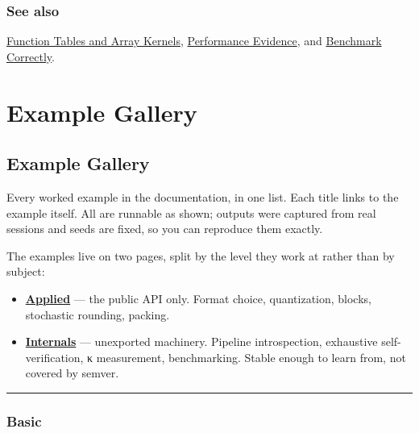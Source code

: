 \subsection{See also}



\label{292862844209942199-dup9}{}


\href{internals\_\allowbreak{}tables.md}{Function Tables and Array Kernels}, \href{examples\_\allowbreak{}performance.md}{Performance Evidence}, and \href{internals\_\allowbreak{}benchmark.md}{Benchmark Correctly}.



\chapter{Example Gallery}


\section{Example Gallery}



\label{8031767541052014994}{}


Every worked example in the documentation, in one list. Each title links to the example itself. All are runnable as shown; outputs were captured from real sessions and seeds are fixed, so you can reproduce them exactly.



The examples live on two pages, split by the level they work at rather than by subject:



\begin{itemize}
\item \textbf{\href{examples\_\allowbreak{}applied.md}{Applied}} — the public API only. Format choice, quantization, blocks, stochastic rounding, packing.


\item \textbf{\href{examples\_\allowbreak{}verification.md}{Internals}} — unexported machinery. Pipeline introspection, exhaustive self-verification, κ measurement, benchmarking. Stable enough to learn from, not covered by semver.

\end{itemize}


{\rule{\textwidth}{1pt}}


\subsection{Basic}



